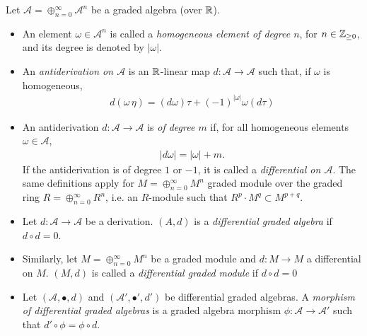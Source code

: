 {\color{gray}
\begin{definition}
Let $\mathcal A = \oplus_{n = 0}^\infty \mathcal A^n$ be a graded algebra (over $\mathbb{R}$).
    \begin{itemize}
    
    \item An element $\omega \in \mathcal A^n$ is called a \emph{homogeneous element of degree $n$}, for $n \in \mathbb{Z}_{\geq 0}$, and its degree is denoted by $|\omega|$.
    
    \item An \emph{antiderivation on $\mathcal A$} is an $\mathbb{R}$-linear map $d: \mathcal A \to \mathcal A$ such that, if $\omega$ is homogeneous, 
    \begin{align*}
        d(\omega \, \eta) = (d\omega)\tau + (-1)^{|\omega|} \omega (d\tau)
    \end{align*}
    
    \item An antiderivation $d: \mathcal A \to \mathcal A$ is \emph{of degree $m$} if, for all homogeneous elements $\omega \in \mathcal A$,
    \begin{align*}
        |d\omega| = |\omega| + m.
    \end{align*}
    If the antiderivation is of degree $1$ or $-1$, it is called a \emph{differential on $\mathcal A$}. The same definitions apply for $M = \oplus_{n = 0}^\infty M^n$ graded module over the graded ring $R = \oplus_{n = 0}^\infty R^n$, i.e. an $R$-module such that $R^p \cdot M^q \subset M^{p+q}$.
    
    \item Let $d: \mathcal A \to \mathcal A$ be a derivation. $(A, d)$ is a \emph{differential graded algebra} if $d \circ d = 0$. 
    
    \item Similarly, let $M = \oplus_{n = 0}^\infty M^n$ be a graded module and $d: M \to M$ a differential on $M$. $(M, d)$ is called a \emph{differential graded module} if $d \circ d = 0$
    
    \item Let $(\mathcal A, \bullet, d)$ and $(\mathcal A', \bullet', d')$ be differential graded algebras. A \emph{morphism of differential graded algebras} is a graded algebra morphism $\phi: \mathcal A \to \mathcal A'$ such that $d' \circ \phi = \phi \circ d$.
    
    \end{itemize}
    
\end{definition}
}

